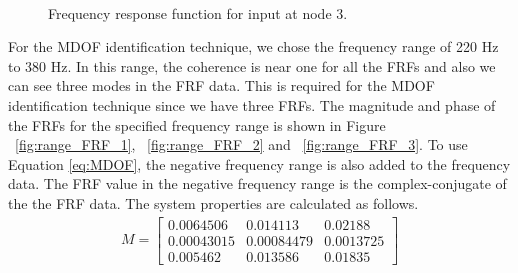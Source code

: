 \documentclass[paper=a4, fontsize=12pt]{scrartcl} %
\begin{document}
\begin{figure}[H]
	\centering
	\quad
	\\
	\caption{Frequency response function for input at node 3.}
	\label{fig:all_FRFs_3}
\end{figure}
%
For the MDOF identification technique, we chose the frequency range of 220 Hz to 380 Hz. In this range, the coherence is near one for all the FRFs and also we can see three modes in the FRF data. This is required for the MDOF identification technique since we have three FRFs. The magnitude and phase of the FRFs for the specified frequency range is shown in Figure ~\ref{fig:range_FRF_1}, ~\ref{fig:range_FRF_2} and ~\ref{fig:range_FRF_3}. To use Equation \eqref{eq:MDOF}, the negative frequency range is also added to the frequency data. The FRF value in the negative frequency range is the complex-conjugate of the the FRF data. The system properties are calculated as follows.
%
\begin{gather*}
M = 
\begin{bmatrix}
	0.0064506 & 0.014113 & 0.02188 \\
	0.00043015 & 0.00084479 & 0.0013725 \\
	0.005462 & 0.013586 & 0.01835
\end{bmatrix}
\end{gather*}
\end{document}
